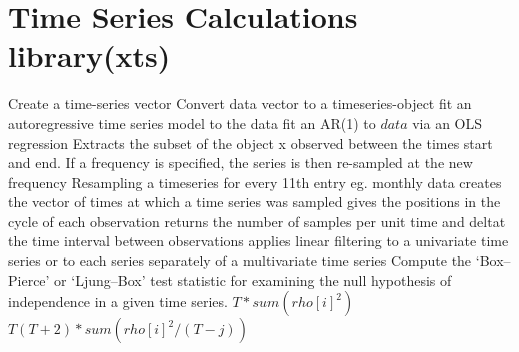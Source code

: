 \section{Time Series Calculations \rarrow library(xts)}{}
	{Create a time-series vector}
	{Convert data vector to a timeseries-object}
	{fit an autoregressive time series model to the data}
	{fit an AR(1) to $data$ via
    an OLS regression}
	{Extracts the subset of the object x observed between the
    times start and end. If a frequency is specified, the series is then re-sampled
    at the new frequency}
	{Resampling a timeseries for
    every 11th entry eg. monthly data}
	{creates the vector of times at which a time series was sampled}
	{gives the positions in the cycle of each observation}
	{returns the number of samples per unit time and deltat the
    time interval between observations}
	{applies linear filtering to a univariate time series
    or to each series separately of a multivariate time series}
	{Compute the `Box--Pierce' or `Ljung--Box'
test statistic for examining the null hypothesis of independence in a given
time series.}
	{$T\ast sum(rho[i]^2)$}
	{$T(T+2)\ast sum(rho[i]^2/(T-j))$}

